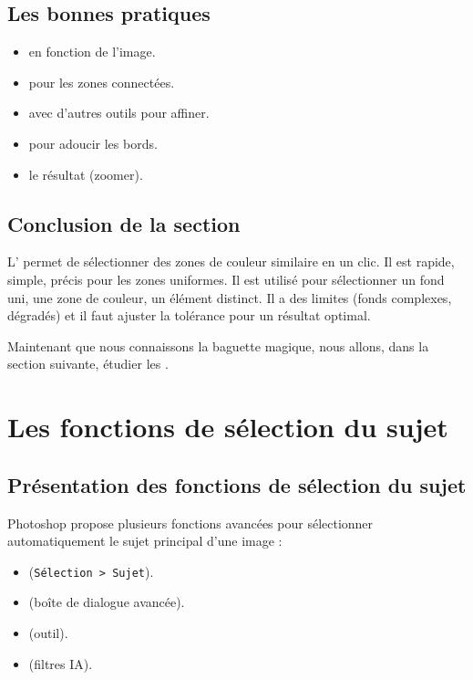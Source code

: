 \subsection{Les bonnes pratiques}

\begin{itemize}
    \item {} en fonction de l'image.
    \item {} pour les zones connectées.
    \item {} avec d'autres outils pour affiner.
    \item {} pour adoucir les bords.
    \item {} le résultat (zoomer).
\end{itemize}

\subsection*{Conclusion de la section}

L' permet de sélectionner des zones de couleur similaire en un clic. Il est rapide, simple, précis pour les zones uniformes. Il est utilisé pour sélectionner un fond uni, une zone de couleur, un élément distinct. Il a des limites (fonds complexes, dégradés) et il faut ajuster la tolérance pour un résultat optimal.

Maintenant que nous connaissons la baguette magique, nous allons, dans la section suivante, étudier les .

\section{Les fonctions de sélection du sujet}

\subsection{Présentation des fonctions de sélection du sujet}

Photoshop propose plusieurs fonctions avancées pour sélectionner automatiquement le sujet principal d'une image :

\begin{itemize}
    \item {} (\texttt{Sélection > Sujet}).
    \item {} (boîte de dialogue avancée).
    \item {} (outil).
    \item {} (filtres IA).
\end{itemize}

